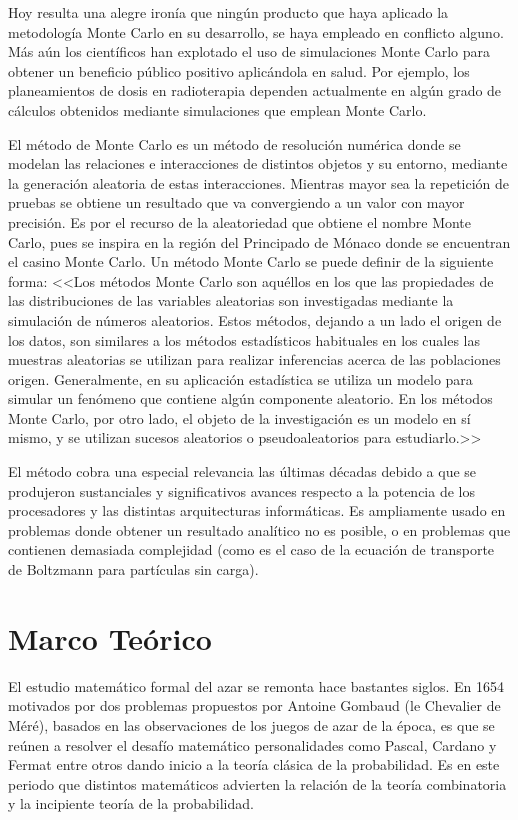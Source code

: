 \documentclass{rbf}
\begin{document}
Hoy resulta una alegre ironía que ningún producto que haya aplicado la metodología Monte Carlo en su desarrollo, se haya empleado en conflicto alguno. Más aún los científicos han explotado el uso de simulaciones Monte Carlo para obtener un beneficio público positivo aplicándola en salud. Por ejemplo, los planeamientos de dosis en radioterapia dependen actualmente en algún grado de cálculos obtenidos mediante simulaciones que emplean Monte Carlo.


El método de Monte Carlo es un método de resolución numérica donde se modelan las relaciones e interacciones de distintos objetos y su entorno, mediante la generación aleatoria de estas interacciones. Mientras mayor sea la repetición de pruebas se obtiene un resultado que va convergiendo a un valor con mayor precisión. Es por el recurso de la aleatoriedad que obtiene el nombre Monte Carlo, pues se inspira en la región del Principado de Mónaco donde se encuentran el casino Monte Carlo.
Un método Monte Carlo se puede definir de la siguiente forma: <<Los métodos Monte Carlo son aquéllos en los que las propiedades de las distribuciones de las variables aleatorias son investigadas mediante la simulación de números aleatorios. Estos métodos, dejando a un lado el origen de los datos, son similares a los métodos estadísticos habituales en los cuales las muestras aleatorias se utilizan para realizar inferencias acerca de las poblaciones origen. Generalmente, en su aplicación estadística se utiliza un modelo para simular un fenómeno que contiene algún componente aleatorio. En los métodos Monte Carlo, por otro lado, el objeto de la investigación es un modelo en sí mismo, y se utilizan sucesos aleatorios o pseudoaleatorios para estudiarlo.>>\cite{Gentle}


El método cobra una especial relevancia las
últimas décadas debido a que se produjeron
sustanciales y significativos avances respecto a la
potencia de los procesadores y las distintas
arquitecturas informáticas. Es ampliamente usado
en problemas donde obtener un resultado
analítico no es posible, o en problemas que
contienen demasiada complejidad (como es el
caso de la ecuación de transporte de Boltzmann
para partículas sin carga).\cite{Kling}
\section{Marco Teórico}\label{inter}
El estudio matemático formal del azar se remonta hace bastantes siglos. En 1654 motivados por dos problemas propuestos por Antoine Gombaud (le Chevalier de Méré), basados en las observaciones de los juegos de azar de la época, es que se reúnen a resolver el desafío matemático personalidades como Pascal, Cardano y Fermat entre otros dando inicio a la teoría clásica de la probabilidad. Es en este periodo que distintos matemáticos advierten la relación de la teoría combinatoria y la incipiente teoría de la probabilidad.
\end{document}
